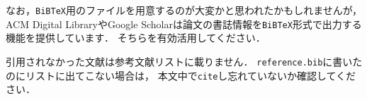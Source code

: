 \documentclass{simplepaper}
\begin{document}
なお，\texttt{BiBTeX}用のファイルを用意するのが大変かと思われたかもしれませんが，
ACM Digital LibraryやGoogle Scholarは論文の書誌情報を\texttt{BiBTeX}形式で出力する機能を提供しています．
そちらを有効活用してください．

引用されなかった文献は参考文献リストに載りません．
\texttt{reference.bib}に書いたのにリストに出てこない場合は，
本文中で\texttt{cite}し忘れていないか確認してください．




\end{document}

